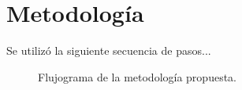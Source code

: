\chapter{Metodología}
\label{chap:metodologia}

Se utilizó la siguiente secuencia de pasos...

\begin{figure}[h!]
    \centering
    \caption{Flujograma de la metodología propuesta.}
    \label{fig:flujograma}
\end{figure}